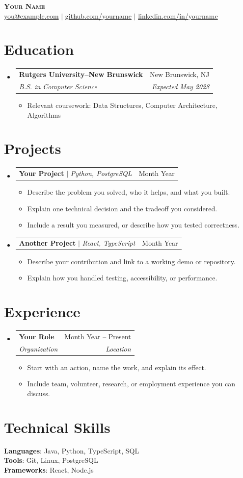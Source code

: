 \documentclass[letterpaper,11pt]{article}
\makeatletter
\newcommand{\resumeItem}[1]{
  \item\small{
    {#1 \vspace{-2pt}}
  }
}
\newcommand{\resumeSubheading}[4]{
  \vspace{-2pt}\item
    \begin{tabular*}{0.97\textwidth}[t]{l@{\extracolsep{\fill}}r}
      \textbf{#1} & #2 \\
      \textit{\small#3} & \textit{\small #4} \\
    \end{tabular*}\vspace{-7pt}
}
\newcommand{\resumeProjectHeading}[2]{
    \item
    \begin{tabular*}{0.97\textwidth}{l@{\extracolsep{\fill}}r}
      \small#1 & #2 \\
    \end{tabular*}\vspace{-7pt}
}
\newcommand{\resumeSubHeadingListStart}{\begin{itemize}[leftmargin=0.15in, label={}]}
\newcommand{\resumeSubHeadingListEnd}{\end{itemize}}
\newcommand{\resumeItemListStart}{\begin{itemize}}
\newcommand{\resumeItemListEnd}{\end{itemize}\vspace{-5pt}}
\makeatother
\begin{document}
\begin{center}
 \textbf{\Huge \scshape Your Name} \\ \vspace{1pt}
 \small \href{mailto:you@example.com}{you@example.com} $|$
 \href{https://github.com/yourname}{github.com/yourname} $|$
 \href{https://linkedin.com/in/yourname}{linkedin.com/in/yourname}
\end{center}
\section{Education}
\resumeSubHeadingListStart
 \resumeSubheading{Rutgers University--New Brunswick}{New Brunswick, NJ}
 {B.S. in Computer Science}{Expected May 2028}
 \resumeItemListStart
 \resumeItem{Relevant coursework: Data Structures, Computer Architecture, Algorithms}
 \resumeItemListEnd
\resumeSubHeadingListEnd
\section{Projects}
\resumeSubHeadingListStart
 \resumeProjectHeading{\textbf{Your Project} $|$ \emph{Python, PostgreSQL}}{Month Year}
 \resumeItemListStart
 \resumeItem{Describe the problem you solved, who it helps, and what you built.}
 \resumeItem{Explain one technical decision and the tradeoff you considered.}
 \resumeItem{Include a result you measured, or describe how you tested correctness.}
 \resumeItemListEnd
 \resumeProjectHeading{\textbf{Another Project} $|$ \emph{React, TypeScript}}{Month Year}
 \resumeItemListStart
 \resumeItem{Describe your contribution and link to a working demo or repository.}
 \resumeItem{Explain how you handled testing, accessibility, or performance.}
 \resumeItemListEnd
\resumeSubHeadingListEnd
\section{Experience}
\resumeSubHeadingListStart
 \resumeSubheading{Your Role}{Month Year -- Present}{Organization}{Location}
 \resumeItemListStart
 \resumeItem{Start with an action, name the work, and explain its effect.}
 \resumeItem{Include team, volunteer, research, or employment experience you can discuss.}
 \resumeItemListEnd
\resumeSubHeadingListEnd
\section{Technical Skills}
\begin{itemize}[leftmargin=0.15in, label={}]
 \small{\item{
 \textbf{Languages}{: Java, Python, TypeScript, SQL} \\
 \textbf{Tools}{: Git, Linux, PostgreSQL} \\
 \textbf{Frameworks}{: React, Node.js}
 }}
\end{itemize}
\end{document}
